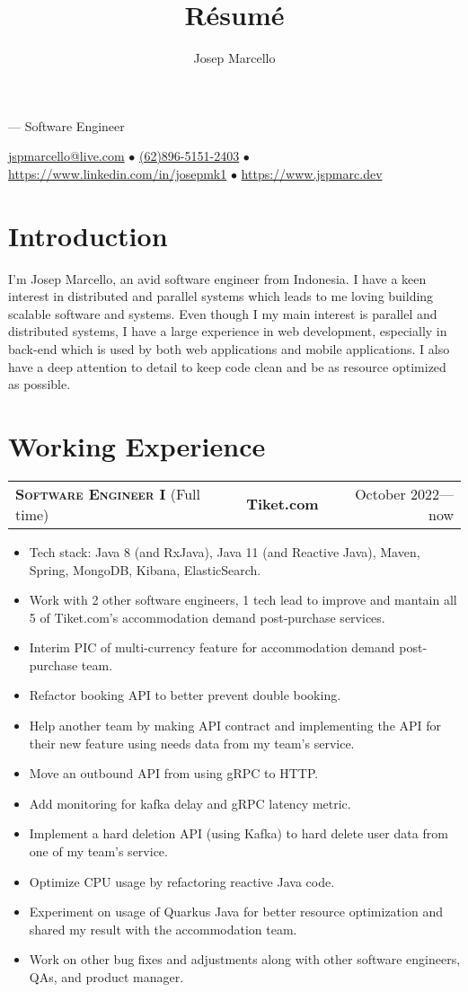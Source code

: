 \documentclass[10pt]{article}
\makeatletter
\renewcommand{\maketitle}{
    \rmfamily
    \noindent
    {\Huge \theauthor} ---
    \sffamily
    Software Engineer

    \vspace{0.1em}
    \noindent
    \href{mailto:jspmarcello@live.com}{jspmarcello@live.com} $\bullet$
    \href{https://wa.me/6289651512403}{(62)896-5151-2403} $\bullet$
    \href{https://www.linkedin.com/in/josepmk1}{https://www.linkedin.com/in/josepmk1} $\bullet$
    \href{https://www.jspmarc.dev}{https://www.jspmarc.dev}
}
\newcommand{\workExpVspace}{1em}
\newcommand{\workExp}[6]{
    \noindent \begin{tabularx}{\textwidth}{@{}X c|r}
        \textbf{\textsc{#5}} (#2) & \textbf{#1} & #3---#4
    \end{tabularx}

    {#6}
    \vspace{\workExpVspace}
}
\makeatother
\begin{document}
\title{R\'esum\'e}
\author{Josep Marcello}

\maketitle

\section{Introduction}

I'm Josep Marcello, an avid software engineer from Indonesia. I have a keen interest in distributed
and parallel systems which leads to me loving building scalable software and systems. Even though I
my main interest is parallel and distributed systems, I have a large experience in web development,
especially in back-end which is used by both web applications and mobile applications. I also have
a deep attention to detail to keep code clean and be as resource optimized as possible.

\section{Working Experience}

\workExp
    {Tiket.com}
    {Full time}
    {October 2022}
    {now}
    {Software Engineer I}
    {
        \begin{itemize}
            \item Tech stack: Java 8 (and RxJava), Java 11 (and Reactive Java), Maven, Spring,
                MongoDB, Kibana, ElasticSearch.
            \item Work with 2 other software engineers, 1 tech lead to improve and mantain
                all 5 of Tiket.com's accommodation demand post-purchase services.
            \item Interim PIC of multi-currency feature for accommodation demand post-purchase
                team.
            \item Refactor booking API to better prevent double booking.
            \item Help another team by making API contract and implementing the API for their new
                feature using needs data from my team’s service.
            \item Move an outbound API from using gRPC to HTTP.
            \item Add monitoring for kafka delay and gRPC latency metric.
            \item Implement a hard deletion API (using Kafka) to hard delete user data from one of
                my team’s service.
            \item Optimize CPU usage by refactoring reactive Java code.
            \item Experiment on usage of Quarkus Java for better resource optimization and shared
                my result with the accommodation team.
            \item Work on other bug fixes and adjustments along with other software engineers,
                QAs, and product manager.
        \end{itemize}
    }
\end{document}
